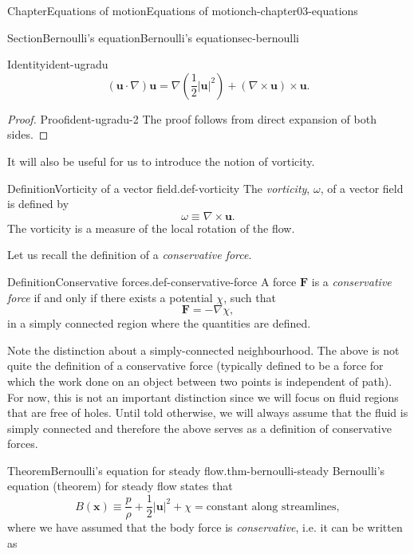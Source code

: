 \documentclass[oneside,10pt,]{book}
\numberwithin{equation}{section}
\newcommand{\bx}{\boldsymbol{x}}
\newcommand{\bu}{\boldsymbol{u}}
\newcommand{\bF}{\boldsymbol{F}}
\begin{document}
\begin{chapterptx}{Chapter}{Equations of motion}{}{Equations of motion}{}{}{ch-chapter03-equations}
\begin{sectionptx}{Section}{Bernoulli's equation}{}{Bernoulli's equation}{}{}{sec-bernoulli}
\begin{introduction}{}
\begin{identity}{Identity}{}{}{ident-ugradu}
\begin{equation}
(\bu \cdot \nabla) \bu = \nabla \left(\frac{1}{2}|\bu|^2\right) + (\nabla \times \bu) \times \bu. \label{eqn-ugradu}
\end{equation}
%
\end{identity}
\begin{proof}{Proof}{}{ident-ugradu-2}
The proof follows from direct expansion of both sides.%
\end{proof}
It will also be useful for us to introduce the notion of vorticity.%
\begin{definition}{Definition}{Vorticity of a vector field.}{def-vorticity}%
The \emph{vorticity}, \(\omega\), of a vector field is defined by%
\begin{equation}
\omega \equiv \nabla \times \bu.\label{eqn-vorticity}
\end{equation}
The vorticity is a measure of the local rotation of the flow.%
\end{definition}
Let us recall the definition of a \emph{conservative force}.%
\begin{definition}{Definition}{Conservative forces.}{def-conservative-force}%
A force \(\bF\) is a \emph{conservative force} if and only if there exists a potential \(\chi\), such that%
\begin{equation*}
\bF = -\nabla \chi,
\end{equation*}
in a simply connected region where the quantities are defined.%
\end{definition}
Note the distinction about a simply-connected neighbourhood. The above is not quite the definition of a conservative force (typically defined to be a force for which the work done on an object between two points is independent of path). For now, this is not an important distinction since we will focus on fluid regions that are free of holes. Until told otherwise, we will always assume that the fluid is simply connected and therefore the above serves as a definition of conservative forces.%
\begin{theorem}{Theorem}{Bernoulli's equation for steady flow.}{}{thm-bernoulli-steady}%
Bernoulli's equation (theorem) for steady flow states that%
\begin{equation}
B(\bx) \equiv \frac{p}{\rho} + \frac{1}{2} |\bu|^2 + \chi = \textrm{constant along streamlines},\label{eqn-bernoulli-steady}
\end{equation}
where we have assumed that the body force is \emph{conservative}, i.e. it can be written as%
\begin{equation}

\end{equation}
\end{theorem}
\end{introduction}
\end{sectionptx}
\end{chapterptx}
\end{document}
